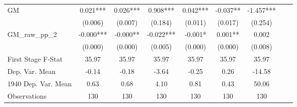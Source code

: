 \begin{tabular}{l*{8}{c}}
GM              &    0.021***&    0.026***&    0.908***&    0.042***&   -0.037** &   -1.457***\\
                &  (0.006)   &  (0.007)   &  (0.184)   &  (0.011)   &  (0.017)   &  (0.254)   \\
\addlinespace
GM\_raw\_pp\_2     &   -0.000***&   -0.000** &   -0.022***&   -0.001*  &    0.001** &    0.002   \\
                &  (0.000)   &  (0.000)   &  (0.005)   &  (0.000)   &  (0.000)   &  (0.008)   \\
\midrule
First Stage F-Stat&    35.97   &    35.97   &    35.97   &    35.97   &    35.97   &    35.97   \\
Dep. Var. Mean  &    -0.14   &    -0.18   &    -3.64   &    -0.25   &     0.26   &   -14.58   \\
1940 Dep. Var. Mean&     0.63   &     0.68   &     4.10   &     0.81   &     0.43   &    50.06   \\
Observations    &      130   &      130   &      130   &      130   &      130   &      130   \\
       \bottomrule \end{tabular}
